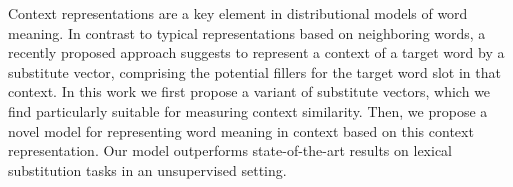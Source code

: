Context representations are a key element in distributional models of word meaning. In contrast to typical representations based on neighboring words, a recently proposed approach suggests to represent a context of a target word by a substitute vector, comprising the potential fillers for the target word slot in that context. In this work we first propose a variant of substitute vectors, which we find particularly suitable for measuring context similarity. Then, we propose a novel model for representing word meaning in context based on this context representation. Our model outperforms state-of-the-art results on lexical substitution tasks in an unsupervised setting.
